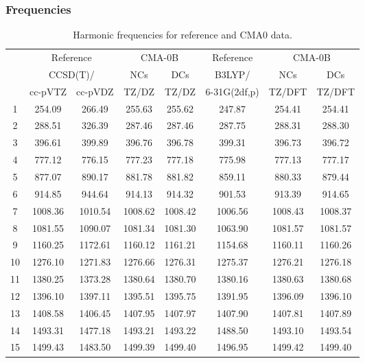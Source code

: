 \documentclass[10pt,oneside]{article}
\begin{document}
\clearpage

\subsubsection*{Frequencies}
\begin{table}[h!]
\centering
\caption{Harmonic frequencies for reference and CMA0 data.}
\begin{tabular}{cccccccc}
\toprule
{} & \multicolumn{2}{c}{Reference} & \multicolumn{2}{c}{CMA-0B} &    Reference & \multicolumn{2}{c}{CMA-0B} \\
{} & \multicolumn{2}{c}{CCSD(T)/} &     NCs &     DCs &       B3LYP/ &     NCs &     DCs \\
{} &   cc-pVTZ & cc-pVDZ &   TZ/DZ &   TZ/DZ & 6-31G(2df,p) &  TZ/DFT &  TZ/DFT \\
\midrule
1  &    254.09 &  266.49 &  255.63 &  255.62 &       247.87 &  254.41 &  254.41 \\
2  &    288.51 &  326.39 &  287.46 &  287.46 &       287.75 &  288.31 &  288.30 \\
3  &    396.61 &  399.89 &  396.76 &  396.78 &       399.31 &  396.73 &  396.72 \\
4  &    777.12 &  776.15 &  777.23 &  777.18 &       775.98 &  777.13 &  777.17 \\
5  &    877.07 &  890.17 &  881.78 &  881.82 &       859.11 &  880.33 &  879.44 \\
6  &    914.85 &  944.64 &  914.13 &  914.32 &       901.53 &  913.39 &  914.65 \\
7  &   1008.36 & 1010.54 & 1008.62 & 1008.42 &      1006.56 & 1008.43 & 1008.37 \\
8  &   1081.55 & 1090.07 & 1081.34 & 1081.30 &      1063.90 & 1081.57 & 1081.57 \\
9  &   1160.25 & 1172.61 & 1160.12 & 1161.21 &      1154.68 & 1160.11 & 1160.26 \\
10 &   1276.10 & 1271.83 & 1276.66 & 1276.31 &      1275.37 & 1276.21 & 1276.18 \\
11 &   1380.25 & 1373.28 & 1380.64 & 1380.70 &      1380.16 & 1380.63 & 1380.68 \\
12 &   1396.10 & 1397.11 & 1395.51 & 1395.75 &      1391.95 & 1396.09 & 1396.10 \\
13 &   1408.58 & 1406.45 & 1407.95 & 1407.97 &      1407.90 & 1407.81 & 1407.89 \\
14 &   1493.31 & 1477.18 & 1493.21 & 1493.22 &      1488.50 & 1493.10 & 1493.54 \\
15 &   1499.43 & 1483.50 & 1499.39 & 1499.40 &      1496.95 & 1499.42 & 1499.40 \\

\end{tabular}
\end{table}
\end{document}
